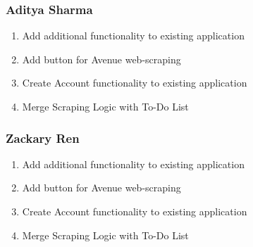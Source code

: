 \documentclass[11pt, oneside]{article}   	%
\begin{document}
\subsubsection*{Aditya Sharma}
\begin{enumerate}
\item Add additional functionality to existing application
\item Add button for Avenue web-scraping
\item Create Account functionality to existing application
\item Merge Scraping Logic with To-Do List
\end{enumerate}

\subsubsection*{Zackary Ren}
\begin{enumerate}
\item Add additional functionality to existing application
\item Add button for Avenue web-scraping
\item Create Account functionality to existing application
\item Merge Scraping Logic with To-Do List
\end{enumerate}
\end{document}
